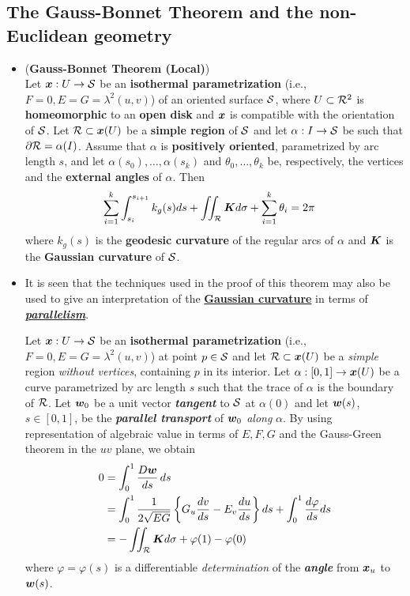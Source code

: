 \documentclass[11pt]{article}
\begin{document}
\subsection{The Gauss-Bonnet Theorem and the non-Euclidean geometry}
\begin{itemize}
\item \begin{theorem}\label{thm: gauss_bonnet_local}  (\textbf{Gauss-Bonnet Theorem (Local)}) \citep{do1976differential}\\
Let $\boldsymbol{x}: U \rightarrow {\mathcal S}$ be an \textbf{isothermal parametrization} (i.e., $F = 0, E = G = \lambda^2(u, v)$) of an oriented surface ${\mathcal S}$, where $U \subset {\mathcal R}^2$ is \textbf{homeomorphic} to an \textbf{open disk} and $\boldsymbol{x}$ is compatible with the orientation of ${\mathcal S}$. Let ${\mathcal R} \subset \boldsymbol{x}(U)$ be a \textbf{simple region} of ${\mathcal S}$ and let $\alpha: I \rightarrow {\mathcal S}$ be such that  $\partial {\mathcal R} = \alpha(I)$. Assume that $\alpha$ is \textbf{positively oriented}, parametrized by arc length $s$, and let $\alpha(s_0),\ldots, \alpha(s_k)$ and $\theta_0,\ldots,\theta_k$ be, respectively, the vertices and the \textbf{external angles} of $\alpha$. Then
\begin{align}
\sum_{i=1}^{k}\int_{s_{i}}^{s_{i+1}}k_{g}(s)ds + \iint_{{\mathcal R}}\boldsymbol{K}d\sigma + \sum_{i=1}^{k}\theta_{i} &= 2\pi \label{eqn: gauss_bonnet}
\end{align} where $k_g(s)$ is the \textbf{geodesic curvature} of the regular arcs of $\alpha$ and $\boldsymbol{K}$ is the
\textbf{Gaussian curvature} of ${\mathcal S}$.
\end{theorem}

\item \begin{remark}
It is seen that the techniques used in the proof of this theorem may also be used to give an interpretation of the \underline{\textbf{Gaussian curvature}} in terms of \underline{\emph{\textbf{parallelism}}}. 

Let $\boldsymbol{x}: U \rightarrow {\mathcal S}$ be an \textbf{isothermal parametrization} (i.e., $F = 0, E = G = \lambda^2(u, v)$) at point $p \in {\mathcal S}$ and let ${\mathcal R} \subset \boldsymbol{x}(U)$ be a \emph{simple} region \emph{without vertices}, containing $p$ in its interior. Let $\alpha: [0,1] \rightarrow \boldsymbol{x}(U)$ be a curve parametrized by arc length $s$ such that the trace of $\alpha$ is the boundary of ${\mathcal R}$. Let $\boldsymbol{w}_0$ be a unit vector \emph{\textbf{tangent}} to ${\mathcal S}$ at $\alpha(0)$ and let $\boldsymbol{w}(s)$, $s \in [0, 1]$, be the \emph{\textbf{parallel transport}} of $\boldsymbol{w}_0$ \emph{along} $\alpha$. By using representation of algebraic value in terms of $E,F,G$ and the Gauss-Green theorem in the $uv$ plane, we obtain
\begin{align*}
 0 &= \int_{0}^{1}\frac{D\boldsymbol{w}}{ds}\,ds \\
 &= \int_{0}^{1} \frac{1}{2\sqrt{EG}}\left\{G_{u}\frac{dv}{ds} - E_{v}\frac{du}{ds}\right\}ds +  \int_{0}^{1}\frac{d\varphi}{ds}ds\\
 &= -\iint_{{\mathcal R}}\boldsymbol{K}d\sigma + \varphi(1) - \varphi(0)
\end{align*} where $\varphi = \varphi(s)$ is a differentiable \emph{determination} of the \emph{\textbf{angle}} from $\boldsymbol{x}_u$ to $\boldsymbol{w}(s)$.


\end{remark}
\end{itemize}
\end{document}
